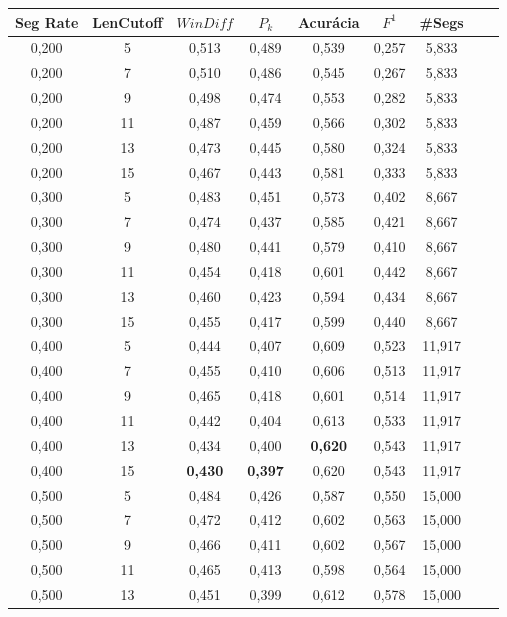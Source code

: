 \documentclass{article}
\begin{document}
\begin{longtable}[c]{|c|c|c|c|c|c|c|c|c|} 
\hline 
 Seg Rate & LenCutoff & $WinDiff$ & $P_k$ & Acurácia & $F^1$ & \#Segs\\ \hline 
 0,200 & 5 & 0,513 & 0,489 & 0,539 & 0,257 & 5,833  \\ \hline 
 0,200 & 7 & 0,510 & 0,486 & 0,545 & 0,267 & 5,833  \\ \hline 
 0,200 & 9 & 0,498 & 0,474 & 0,553 & 0,282 & 5,833  \\ \hline 
 0,200 & 11 & 0,487 & 0,459 & 0,566 & 0,302 & 5,833  \\ \hline 
 0,200 & 13 & 0,473 & 0,445 & 0,580 & 0,324 & 5,833  \\ \hline 
 0,200 & 15 & 0,467 & 0,443 & 0,581 & 0,333 & 5,833  \\ \hline 
 0,300 & 5 & 0,483 & 0,451 & 0,573 & 0,402 & 8,667  \\ \hline 
 0,300 & 7 & 0,474 & 0,437 & 0,585 & 0,421 & 8,667  \\ \hline 
 0,300 & 9 & 0,480 & 0,441 & 0,579 & 0,410 & 8,667  \\ \hline 
 0,300 & 11 & 0,454 & 0,418 & 0,601 & 0,442 & 8,667  \\ \hline 
 0,300 & 13 & 0,460 & 0,423 & 0,594 & 0,434 & 8,667  \\ \hline 
 0,300 & 15 & 0,455 & 0,417 & 0,599 & 0,440 & 8,667  \\ \hline 
 0,400 & 5 & 0,444 & 0,407 & 0,609 & 0,523 & 11,917  \\ \hline 
 0,400 & 7 & 0,455 & 0,410 & 0,606 & 0,513 & 11,917  \\ \hline 
 0,400 & 9 & 0,465 & 0,418 & 0,601 & 0,514 & 11,917  \\ \hline 
 0,400 & 11 & 0,442 & 0,404 & 0,613 & 0,533 & 11,917  \\ \hline 
 0,400 & 13 & 0,434 & 0,400 & \cellcolor{gray!20} \textbf{0,620} & 0,543 & 11,917  \\ \hline 
 0,400 & 15 & \cellcolor{gray!20} \textbf{0,430} & \cellcolor{gray!20} \textbf{0,397} & 0,620 & 0,543 & 11,917  \\ \hline 
 0,500 & 5 & 0,484 & 0,426 & 0,587 & 0,550 & 15,000  \\ \hline 
 0,500 & 7 & 0,472 & 0,412 & 0,602 & 0,563 & 15,000  \\ \hline 
 0,500 & 9 & 0,466 & 0,411 & 0,602 & 0,567 & 15,000  \\ \hline 
 0,500 & 11 & 0,465 & 0,413 & 0,598 & 0,564 & 15,000  \\ \hline 
 0,500 & 13 & 0,451 & 0,399 & 0,612 & 0,578 & 15,000  \\ \hline 

\end{longtable}
\end{document}
